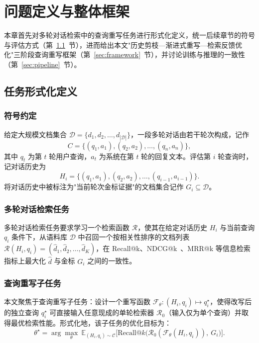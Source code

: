 \chapter{问题定义与整体框架}
\label{chap:framework}

本章首先对多轮对话检索中的查询重写任务进行形式化定义，统一后续章节的符号与评估方式（第~\ref{sec:formal}~节），进而给出本文"历史剪枝—渐进式重写—检索反馈优化"三阶段查询重写框架（第~\ref{sec:framework}~节），并讨论训练与推理的一致性（第~\ref{sec:pipeline}~节）。

\section{任务形式化定义}
\label{sec:formal}

\subsection{符号约定}

给定大规模文档集合 $\mathcal{D}=\{d_1, d_2, \dots, d_{|\mathcal{D}|}\}$，一段多轮对话由若干轮次构成，记作
\begin{equation}
C = \{(q_1, a_1), (q_2, a_2), \dots, (q_n, a_n)\},
\end{equation}
其中 $q_t$ 为第 $t$ 轮用户查询，$a_t$ 为系统在第 $t$ 轮的回复文本。评估第 $i$ 轮查询时，记对话历史为
\begin{equation}
H_i = \{(q_1, a_1), (q_2, a_2), \dots, (q_{i-1}, a_{i-1})\}.
\end{equation}
将对话历史中被标注为"当前轮次金标证据"的文档集合记作 $G_i \subseteq \mathcal{D}$。

\subsection{多轮对话检索任务}

多轮对话检索任务要求学习一个检索函数 $\mathcal{R}$，使其在给定对话历史 $H_i$ 与当前查询 $q_i$ 条件下，从语料库 $\mathcal{D}$ 中召回一个按相关性排序的文档列表 $\mathcal{R}(H_i, q_i) = (\hat{d}_1, \hat{d}_2, \dots, \hat{d}_K)$，在 Recall@k、NDCG@k~\citep{jarvelin2002cumulated}、MRR@k 等信息检索指标上最大化 $\hat{d}$ 与金标 $G_i$ 之间的一致性。

\subsection{查询重写子任务}

本文聚焦于查询重写子任务：设计一个重写函数 $\mathcal{F}_\theta:(H_i, q_i) \mapsto q_i^\star$，使得改写后的独立查询 $q_i^\star$ 可直接输入任意现成的单轮检索器 $\mathcal{R}_0$（输入仅为单个查询）并取得最优检索性能。形式化地，该子任务的优化目标为：
\begin{equation}
\theta^\star = \arg\max_{\theta}\ \mathbb{E}_{(H_i, q_i)\sim \mathcal{C}}\Big[\text{Recall@}k\big(\mathcal{R}_0(\mathcal{F}_\theta(H_i, q_i)),\ G_i\big)\Big].
\label{eq:qr_obj}
\end{equation}

